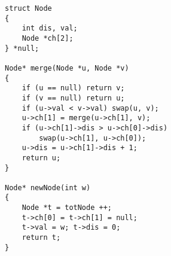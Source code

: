 \begin{lstlisting}
struct Node
{
	int dis, val;
	Node *ch[2];
} *null;

Node* merge(Node *u, Node *v)
{
	if (u == null) return v;
	if (v == null) return u;
	if (u->val < v->val) swap(u, v);
	u->ch[1] = merge(u->ch[1], v);
	if (u->ch[1]->dis > u->ch[0]->dis)
		swap(u->ch[1], u->ch[0]);
	u->dis = u->ch[1]->dis + 1;
	return u;
}

Node* newNode(int w)
{
	Node *t = totNode ++;
	t->ch[0] = t->ch[1] = null;
	t->val = w; t->dis = 0;
	return t;
}
\end{lstlisting}
